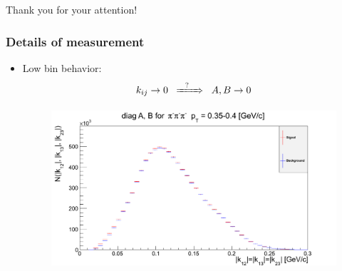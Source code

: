 \documentclass{beamer}
\begin{document}
\begin{frame}
\begin{center}
\Huge{Thank you for your attention!}
\end{center}
\end{frame}

\begin{frame}
\frametitle{Details of measurement}
\begin{itemize}
\setlength{\itemsep}{16pt}
\item Low bin behavior:
\begin{equation}
k_{ij}\rightarrow 0 \;\;\xRightarrow{\;\;\;?\;\;\;\;}\;\; A,B\rightarrow 0
\end{equation}
\begin{figure}
\includegraphics[scale=0.25]{pic/AB2}
\end{figure}
\end{itemize}
\end{frame}
\end{document}
